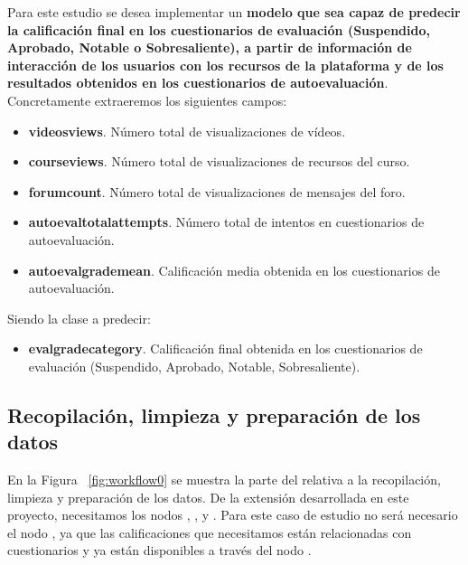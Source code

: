 Para este estudio se desea implementar un \textbf{modelo que sea capaz de predecir la calificación final en los cuestionarios de evaluación (Suspendido, Aprobado, Notable o Sobresaliente), 
a partir de información de interacción de los usuarios con los recursos de la plataforma y de los resultados obtenidos en los cuestionarios de autoevaluación}. 
Concretamente extraeremos los siguientes campos: 

\begin{itemize}
	\item \textbf{videosviews}. Número total de visualizaciones de vídeos.
	\item \textbf{courseviews}. Número total de visualizaciones de recursos del curso.
	\item \textbf{forumcount}. Número total de visualizaciones de mensajes del foro. 
	\item \textbf{autoevaltotalattempts}. Número total de intentos en cuestionarios de autoevaluación. 
	\item \textbf{autoevalgrademean}. Calificación media obtenida en los cuestionarios de autoevaluación.
\end{itemize}

Siendo la clase a predecir: 

\begin{itemize}
	\item \textbf{evalgradecategory}. Calificación final obtenida en los cuestionarios de evaluación (Suspendido, Aprobado, Notable, Sobresaliente). 
\end{itemize}


\subsection{Recopilación, limpieza y preparación de los datos}

En la Figura ~\ref{fig:workflow0} se muestra la parte del  relativa a la recopilación, limpieza y preparación de los datos. De la extensión desarrollada en 
este proyecto, necesitamos los nodos , ,  y . Para este caso de estudio no 
será necesario el nodo , ya que las calificaciones que necesitamos están relacionadas con cuestionarios y ya están disponibles a través del nodo . 

